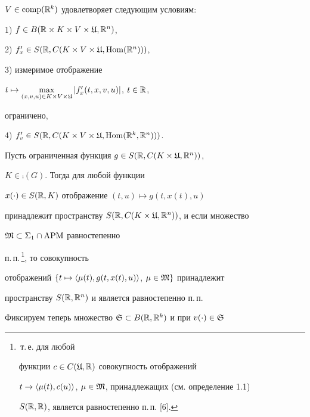$V\in \operatorname{comp}(\Bbb R^{k})$ удовлетворяет следующим условиям:





1) $f\in B(\Bbb R\times K\times V\times\frak U,\Bbb R^{n})$,





2) $f'_{x}\in S(\Bbb R,C(K\times V\times\frak U,\operatorname{Hom}(\Bbb R^{n})))$,





3) измеримое отображение


$t\mapsto\max\limits_{(x,v,u)\in K\times V\times\frak U}|f'_x(t,x,v,u)|$, $t\in\Bbb R$,


ограничено,





4) $f'_{v}\in S(\Bbb R,C(K\times V\times\frak U,\operatorname{Hom}(\Bbb R^{k},\Bbb R^{n})))$.








\begin{thms}


Пусть ограниченная функция $g\in S(\Bbb R,C(K\times\frak U,\Bbb R^{n}))$,


$K\in \comp(G)$. Тогда для любой функции


$x(\cdot)\in S(\Bbb R,K)$ отображение $(t,u)\mapsto g(t,x(t),u)$


принадлежит пространству $S(\Bbb R,C(K\times\frak U,\Bbb R^{n}))$, и если множество


$\frak M\subset\Sigma_{1}\cap {\operatorname{APM}}$ равностепенно


п.\,п.\,\footnote{\,т.\,е. для любой


функции $c\in C(\frak U,\Bbb R)$ совокупность отображений


$t\to\langle\mu(t),c(u)\rangle$, $\mu\in\frak M$, принадлежащих (см. определение 1.1)


$S(\Bbb R,\Bbb R)$, является равностепенно п.\,п. [6].}, то совокупность


отображений $\{t\mapsto\langle\mu(t),g(t,x(t),u)\rangle$, $\mu\in\frak M\}$ принадлежит


пространству $S(\Bbb R,\Bbb R^{n})$ и является равностепенно п.\,п.


\end{thms}





Фиксируем теперь множество $\frak S\subset B(\Bbb R,\Bbb R^{k})$ и при $v(\cdot)\in\frak S$


